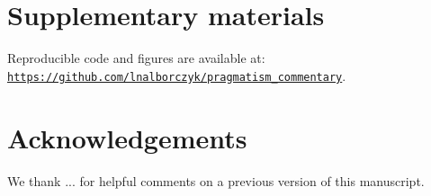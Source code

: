 \documentclass[a4paper,man,natbib,floatsintext,donotrepeattitle]{apa6}
\begin{document}
\section{Supplementary materials}

Reproducible code and figures are available at: \href{https://github.com/lnalborczyk/pragmatism_commentary}{\nolinkurl{https://github.com/lnalborczyk/pragmatism_commentary}}.

\section{Acknowledgements}

We thank ... for helpful comments on a previous version of this manuscript.




  
\end{document}
